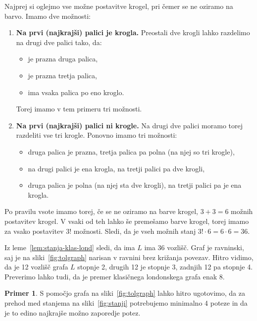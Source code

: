 \documentclass[12pt,a4paper]{amsart}
\theoremstyle{definition} %
\newtheorem{primer}[definicija]{Primer}
\theoremstyle{plain} %
\begin{document}
\proof
    Najprej si oglejmo vse možne postavitve krogel, pri čemer se ne oziramo na barvo.
    Imamo dve možnosti:
    \begin{enumerate}
        \item \textbf{Na prvi (najkrajši) palici je krogla.}
        Preostali dve krogli lahko razdelimo na drugi dve palici tako, da:
        \begin{itemize}[label={-}]
            \item je prazna druga palica,
            \item je prazna tretja palica,
            \item ima vsaka palica po eno kroglo.
        \end{itemize}
        Torej imamo v tem primeru tri možnosti.
        
        \item \textbf{Na prvi (najkrajši) palici ni krogle.}
        Na drugi dve palici moramo torej razdeliti vse tri krogle.
        Ponovno imamo tri možnosti:
        \begin{itemize}[label={-}]
            \item druga palica je prazna, tretja palica pa polna (na njej so tri krogle),
            \item na drugi palici je ena krogla, na tretji palici pa dve krogli,
            \item druga palica je polna (na njej sta dve krogli), na tretji palici pa je ena krogla.
        \end{itemize}
    \end{enumerate}
    Po pravilu vsote imamo torej, če se ne oziramo na barve krogel, $3+3=6$ možnih postavitev krogel.
    V vsaki od teh lahko še premešamo barve krogel, torej imamo za vsako postavitev $3!$ možnosti. Sledi, da je vseh možnih stanj $3! \cdot 6 = 6 \cdot 6 = 36$.\qedhere
\endproof

Iz leme~\ref{lem:stanja-klas-lond} sledi, da ima $L$ ima 36 vozlišč. Graf je ravninski, saj je na sliki~\ref{fig:tolgraph} narisan v ravnini brez križanja povezav. Hitro vidimo, da je 12 vozlišč grafa $L$ stopnje 2, drugih 12 je stopnje 3, zadnjih 12 pa stopnje 4. Preverimo lahko tudi, da je premer klasičnega londonskega grafa enak 8.

\begin{primer}
    S pomočjo grafa na sliki~\ref{fig:tolgraph} lahko hitro ugotovimo, da za prehod med stanjema na sliki~\ref{fig:stanji} potrebujemo minimalno 4 poteze in da je to edino najkrajše možno zaporedje potez.
\end{primer}
\end{document}
